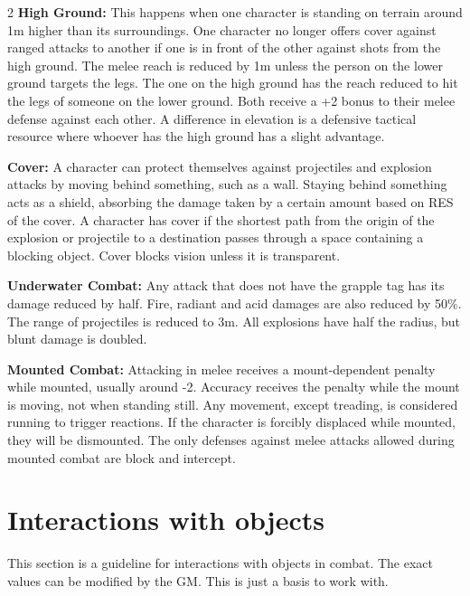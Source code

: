 \begin{multicols}{2}
\textbf{High Ground:} This happens when one character is standing on terrain around 1m higher than its surroundings. One character no longer offers cover against ranged attacks to another if one is in front of the other against shots from the high ground. The melee reach is reduced by 1m unless the person on the lower ground targets the legs. The one on the high ground has the reach reduced to hit the legs of someone on the lower ground. Both receive a +2 bonus to their melee defense against each other. A difference in elevation is a defensive tactical resource where whoever has the high ground has a slight advantage.

\textbf{Cover:} A character can protect themselves against projectiles and explosion attacks by moving behind something, such as a wall. Staying behind something acts as a shield, absorbing the damage taken by a certain amount based on RES of the cover. A character has cover if the shortest path from the origin of the explosion or projectile to a destination passes through a space containing a blocking object. Cover blocks vision unless it is transparent.


\textbf{Underwater Combat:} Any attack that does not have the grapple tag has its damage reduced by half. Fire, radiant and acid damages are also reduced by 50\%. The range of projectiles is reduced to 3m. All explosions have half the radius, but blunt damage is doubled.

\textbf{Mounted Combat:} Attacking in melee receives a mount-dependent penalty while mounted, usually around -2. Accuracy receives the penalty while the mount is moving, not when standing still. Any movement, except treading, is considered running to trigger reactions. If the character is forcibly displaced while mounted, they will be dismounted. The only defenses against melee attacks allowed during mounted combat are block and intercept.

\section{Interactions with objects}

This section is a guideline for interactions with objects in combat. The exact values can be modified by the GM. This is just a basis to work with.


\end{multicols}
